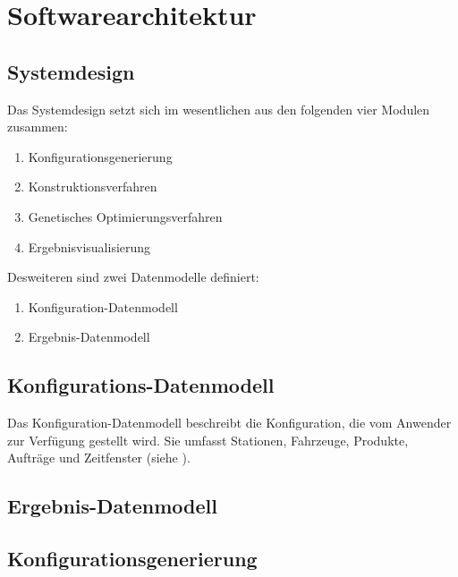 \section{Softwarearchitektur}

\subsection{Systemdesign}
Das Systemdesign setzt sich im wesentlichen aus den folgenden vier Modulen zusammen:
\begin{enumerate}
 \item Konfigurationsgenerierung
 \item Konstruktionsverfahren
 \item Genetisches Optimierungsverfahren
 \item Ergebnisvisualisierung
\end{enumerate}
Desweiteren sind zwei Datenmodelle definiert:
\begin{enumerate}
 \item Konfiguration-Datenmodell
 \item Ergebnis-Datenmodell
\end{enumerate}

\subsection{Konfigurations-Datenmodell}
Das Konfiguration-Datenmodell beschreibt die Konfiguration, die vom Anwender zur Verfügung gestellt wird. Sie umfasst Stationen, Fahrzeuge, Produkte, Aufträge und Zeitfenster (siehe ). 


\subsection{Ergebnis-Datenmodell}

\subsection{Konfigurationsgenerierung}
